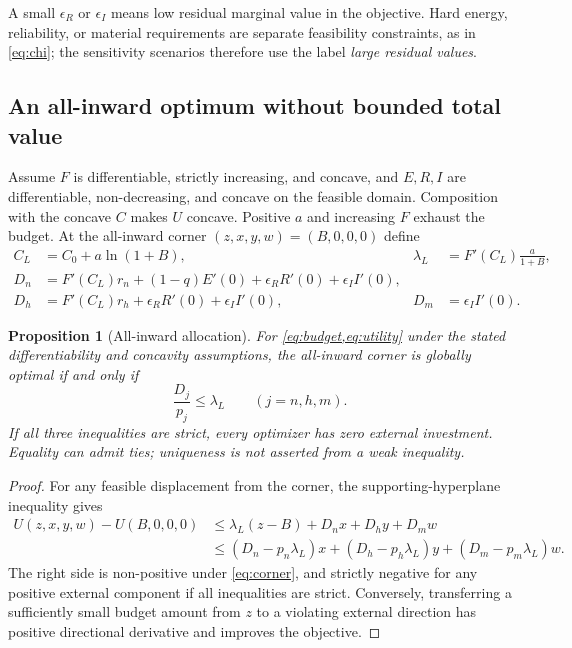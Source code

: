 \documentclass[11pt,a4paper]{article}
\newtheorem{proposition}{Proposition}
\theoremstyle{definition}\newtheorem{definition}{Definition}
\begin{document}
A small $\epsilon_R$ or $\epsilon_I$ means low residual marginal value in the objective. Hard energy, reliability, or material requirements are separate feasibility constraints, as in \cref{eq:chi}; the sensitivity scenarios therefore use the label \emph{large residual values}.

\subsection{An all-inward optimum without bounded total value}

Assume $F$ is differentiable, strictly increasing, and concave, and $E,R,I$ are differentiable, non-decreasing, and concave on the feasible domain. Composition with the concave $C$ makes $U$ concave. Positive $a$ and increasing $F$ exhaust the budget. At the all-inward corner $(z,x,y,w)=(B,0,0,0)$ define
\begin{align}
 C_L&=C_0+a\ln(1+B),&
 \lambda_L&=F'(C_L)\frac{a}{1+B},\label{eq:local-return}\\
 D_n&=F'(C_L)r_n+(1-q)E'(0)+\epsilon_RR'(0)+\epsilon_II'(0),\nonumber\\
 D_h&=F'(C_L)r_h+\epsilon_RR'(0)+\epsilon_II'(0),&
 D_m&=\epsilon_II'(0).\label{eq:external-return}
\end{align}

\begin{proposition}[All-inward allocation]
\label{prop:corner}
For \cref{eq:budget,eq:utility} under the stated differentiability and concavity assumptions, the all-inward corner is globally optimal if and only if
\begin{equation}
 \frac{D_j}{p_j}\leq\lambda_L\qquad(j=n,h,m).
 \label{eq:corner}
\end{equation}
If all three inequalities are strict, every optimizer has zero external investment. Equality can admit ties; uniqueness is not asserted from a weak inequality.
\end{proposition}
\begin{proof}
For any feasible displacement from the corner, the supporting-hyperplane inequality gives
\begin{align}
 U(z,x,y,w)-U(B,0,0,0)
 &\leq\lambda_L(z-B)+D_nx+D_hy+D_mw\nonumber\\
 &\leq(D_n-p_n\lambda_L)x+(D_h-p_h\lambda_L)y
 +(D_m-p_m\lambda_L)w.
 \label{eq:cornerproof}
\end{align}
The right side is non-positive under \cref{eq:corner}, and strictly negative for any positive external component if all inequalities are strict. Conversely, transferring a sufficiently small budget amount from $z$ to a violating external direction has positive directional derivative and improves the objective.
\end{proof}
\end{document}
